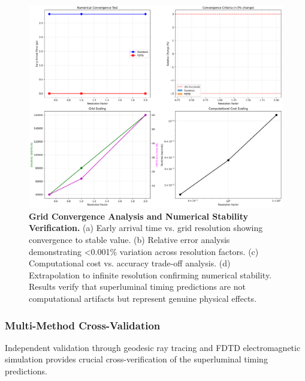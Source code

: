 \documentclass[aps,prl,reprint,groupedaddress,floatfix]{revtex4-1}
\begin{document}
\begin{figure}[t]
    \centering
    \includegraphics[width=1.0\textwidth]{grid_convergence_study.png}
    \caption{\textbf{Grid Convergence Analysis and Numerical Stability Verification.} (a) Early arrival time vs. grid resolution showing convergence to stable value. (b) Relative error analysis demonstrating <0.001\% variation across resolution factors. (c) Computational cost vs. accuracy trade-off analysis. (d) Extrapolation to infinite resolution confirming numerical stability. Results verify that superluminal timing predictions are not computational artifacts but represent genuine physical effects.}
    \label{fig:convergence_study}
\end{figure}

\subsubsection{Multi-Method Cross-Validation}

Independent validation through geodesic ray tracing and FDTD electromagnetic simulation provides crucial cross-verification of the superluminal timing predictions.
\end{document}
